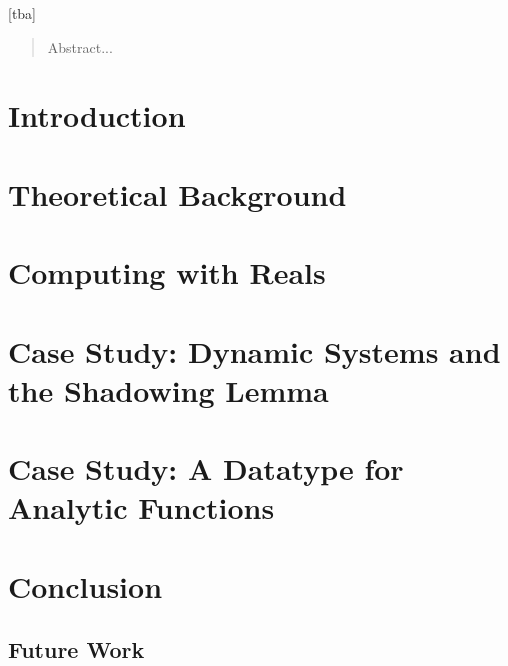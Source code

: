 \documentclass[tudarticle,type=msc,colorback,accentcolor=tud9c]{tudthesis}
\begin{document}
  \author{Holger Thies}
  [tba]
  \dateofexam{\today}{\today}
  \makethesistitle
\dedication{Danksagung...}
\begin{abstract}
    Abstract...
\end{abstract}  
\tableofcontents
  \chapter{Introduction}
  
  \chapter{Theoretical Background}
  
  
  \chapter{Computing with Reals}
  
  
  
  
  
  
  \chapter{Case Study: Dynamic Systems and the Shadowing Lemma}
  
  \chapter{Case Study: A Datatype for Analytic Functions}
  
  \chapter{Conclusion}
   \section{Future Work}
  
\end{document}
